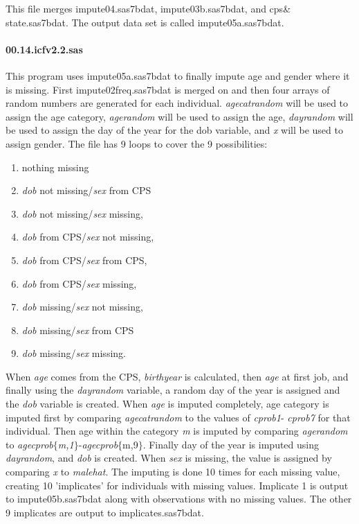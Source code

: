 This file merges impute04.sas7bdat, impute03b.sas7bdat, and cps{\&}%
state.sas7bdat. The output data set is called impute05a.sas7bdat.

\paragraph{00.14.icfv2.2.sas}

This program uses impute05a.sas7bdat to finally impute age and gender where
it is missing. First impute02freq.sas7bdat is merged on and then four arrays
of random numbers are generated for each individual. \textit{agecatrandom}
will be used to assign the age category, \textit{agerandom} will be used to
assign the age, \textit{dayrandom} will be used to assign the day of the
year for the dob variable, and \textit{x} will be used to assign gender. The
file has 9 loops to cover the 9 possibilities:

\begin{enumerate}
\item nothing missing

\item \textit{dob} not missing/\textit{sex} from CPS

\item \textit{dob} not missing/\textit{sex} missing,

\item \textit{dob} from CPS/\textit{sex} not missing,

\item \textit{dob} from CPS/\textit{sex} from CPS,

\item \textit{dob} from CPS/\textit{sex} missing,

\item \textit{dob} missing/\textit{sex} not missing,

\item \textit{dob} missing/\textit{sex} from CPS

\item \textit{dob} missing/\textit{sex} missing.
\end{enumerate}

When \textit{age} comes from the CPS, \textit{birthyear} is calculated, then 
\textit{age} at first job, and finally using the \textit{dayrandom}
variable, a random day of the year is assigned and the \textit{dob} variable
is created. When \textit{age} is imputed completely, age category is imputed
first by comparing \textit{agecatrandom} to the values of \textit{cprob1}- 
\textit{cprob7} for that individual. Then age within the category \textit{m}
is imputed by comparing \textit{agerandom} to \textit{agecprob$\lbrace$m,1$%
\rbrace$}-\textit{agecprob}$\lbrace$m,9$\rbrace$. Finally day of the year is
imputed using \textit{dayrandom}, and \textit{dob} is created. When \textit{%
sex} is missing, the value is assigned by comparing \textit{x} to \textit{%
malehat}. The imputing is done 10 times for each missing value, creating 10
'implicates' for individuals with missing values. Implicate 1 is output to
impute05b.sas7bdat along with observations with no missing values. The other
9 implicates are output to implicates.sas7bdat.

